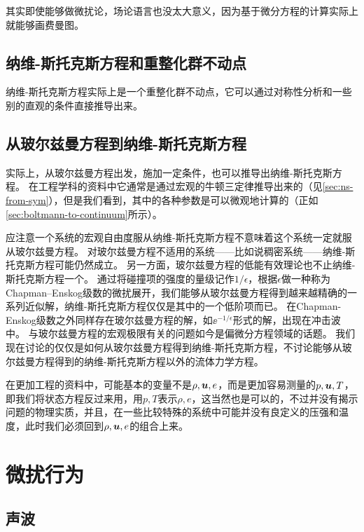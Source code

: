其实即使能够做微扰论，场论语言也没太大意义，因为基于微分方程的计算实际上就能够画费曼图。

\subsection{纳维-斯托克斯方程和重整化群不动点}

纳维-斯托克斯方程实际上是一个重整化群不动点，它可以通过对称性分析和一些别的直观的条件直接推导出来\cite{Visscher_1985}。

\subsection{从玻尔兹曼方程到纳维-斯托克斯方程}\label{sec:from-boltmann-to-ns}

实际上，从玻尔兹曼方程出发，施加一定条件，也可以推导出纳维-斯托克斯方程。
在工程学科的资料中它通常是通过宏观的牛顿三定律推导出来的（见\autoref{sec:ns-from-sym}），但是我们看到，其中的各种参数是可以微观地计算的（正如\autoref{sec:boltmann-to-continuum}所示）。

应注意一个系统的宏观自由度服从纳维-斯托克斯方程不意味着这个系统一定就服从玻尔兹曼方程。
对玻尔兹曼方程不适用的系统——比如说稠密系统——纳维-斯托克斯方程可能仍然成立。
另一方面，玻尔兹曼方程的低能有效理论也不止纳维-斯托克斯方程一个。
通过将碰撞项的强度的量级记作$1/\epsilon$，根据$\epsilon$做一种称为Chapman–Enskog级数的微扰展开\cite{chapman_mathematical_1990}，我们能够从玻尔兹曼方程得到越来越精确的一系列近似解，纳维-斯托克斯方程仅仅是其中的一个低阶项而已。
在Chapman-Enskog级数之外同样存在玻尔兹曼方程的解，如$\ee^{- 1 / \epsilon}$形式的解，出现在冲击波中。    
与玻尔兹曼方程的宏观极限有关的问题如今是偏微分方程领域的话题。
我们现在讨论的仅仅是如何从玻尔兹曼方程得到纳维-斯托克斯方程，不讨论能够从玻尔兹曼方程得到的纳维-斯托克斯方程以外的流体力学方程。

在更加工程的资料中，可能基本的变量不是$\rho, \vb*{u}, e$，而是更加容易测量的$p, \vb*{u}, T$，即我们将状态方程反过来用，用$p, T$表示$\rho, e$，这当然也是可以的，不过并没有揭示问题的物理实质，并且，在一些比较特殊的系统中可能并没有良定义的压强和温度，此时我们必须回到$\rho, \vb*{u}, e$的组合上来。

\section{微扰行为}

\subsection{声波}

